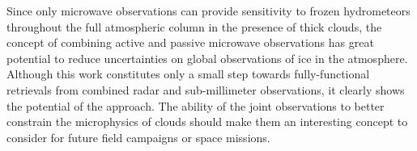 \documentclass[journal abbreviation, manuscript]{copernicus}
\begin{document}
Since only microwave observations can provide sensitivity to frozen hydrometeors
throughout the full atmospheric column in the presence of thick clouds, the
concept of combining active and passive microwave observations has great
potential to reduce uncertainties on global observations of ice in the
atmosphere. Although this work constitutes only a small step towards
fully-functional retrievals from combined radar and sub-millimeter observations,
it clearly shows the potential of the approach. The ability of the joint
observations to better constrain the microphysics of clouds should make them an
interesting concept to consider for future field campaigns or space missions.





\dataavailability{} %



\appendix
\section{}    %

\subsection{}     %


\noappendix       %



\end{document}
